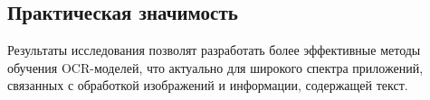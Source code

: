 \subsection{Практическая значимость} 

Результаты  исследования  позволят  разработать  более  эффективные  методы  обучения  OCR-моделей,  что  актуально  для  широкого  спектра  приложений,  связанных  с  обработкой  изображений  и  информации,  содержащей  текст.

\newpage
